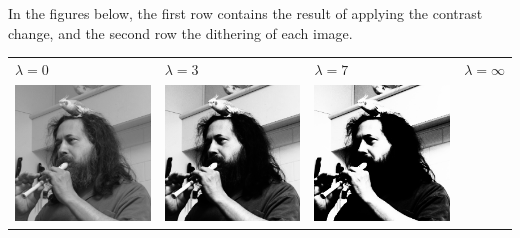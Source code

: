 In the figures below, the first row contains the result of applying the
contrast change, and the second row the dithering of each image.

\begin{tabular}{llll}
	$\lambda=0$ &
	$\lambda=3$ &
	$\lambda=7$ &
	$\lambda=\infty$ \\
	\includegraphics{weiro-tanh0.png} &
	\includegraphics{weiro-tanh3.png} &
	\includegraphics{weiro-tanh7.png} &

\end{tabular}
